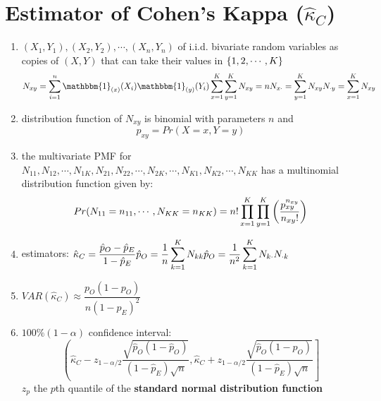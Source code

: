 \section{Estimator of Cohen’s Kappa ($\hat{\kappa}_C$) \cite{ism-1}} \label{Multivariate Distributions: Estimator of Cohen’s Kappa}


\begin{enumerate}
    \item $(X_1, Y_1), (X_2, Y_2), \cdots , (X_n, Y_n)$ of i.i.d. bivariate random variables as copies of $(X, Y)$ that can take their values in $\left\{1, 2,\cdots, K\right\}$
    \[
        \hfill
        N_{xy} = \dsum_{i=1}^{n}
        \mathbbm{1}_{(x)}(X_i) \mathbbm{1}_{(y)}(Y_i)
        \hfill
        \dsum_{x=1}^{K} \dsum_{y=1}^{K} N_{xy} = n
        \hfill
        N_{x\cdot} = \dsum_{y=1}^{K} N_{xy}
        \hfill
        N_{\cdot y} = \dsum_{x=1}^{K} N_{xy}
        \hfill
    \]

    \item distribution function of $N_{xy}$ is binomial with parameters $n$ and 
    \[
        p_{xy} = Pr(X = x, Y = y)
    \]

    \item the multivariate PMF for $N_{11}, N_{12},\cdots, N_{1K}, N_{21}, N_{22},\cdots, N_{2K} , \cdots, N_{K1}, N_{K2},\cdots, N_{KK}$ has a multinomial distribution function given by:
    \[
        Pr(N_{11}=n_{11},\cdots,N_{KK}=n_{KK})
        = n!\displaystyle\prod_{x=1}^{K} \displaystyle\prod_{y=1}^{K}
        \left( \dfrac{p_{xy}^{n_{xy}}}{n_{xy}!} \right)
    \]

    \item estimators: $
        \hfill
        \hat{\kappa}_C = \dfrac{\hat{p}_O - \hat{p}_E}{1 - \hat{p}_E}
        \hfill
        \hat{p}_O = \dfrac{1}{n} \dsum_{k=1}^K N_{kk}
        \hfill
        \hat{p}_O = \dfrac{1}{n^2} \dsum_{k=1}^K 
        N_{k\cdot}N_{\cdot k}
        \hfill
    $
    
    \item $
        VAR(\hat{\kappa}_C)
        \approx \dfrac{p_O(1 - p_O)}{n(1 - p_E)^2}
    $

    \item $100\%(1 - \alpha)$ confidence interval:
    \[\left(
        \hat{\kappa}_C - z_{1-\alpha/2}
        \dfrac{\sqrt{\hat{p}_O(1-\hat{p}_O)}}{(1 - \hat{p}_E)\sqrt{n}},
        \hat{\kappa}_C + z_{1-\alpha/2}
        \dfrac{\sqrt{\hat{p}_O(1-\hat{p}_O)}}{(1 - \hat{p}_E)\sqrt{n}}
    \right]\]
    $z_p$ the $p$th quantile of the \textbf{standard normal distribution function}

    
\end{enumerate}


